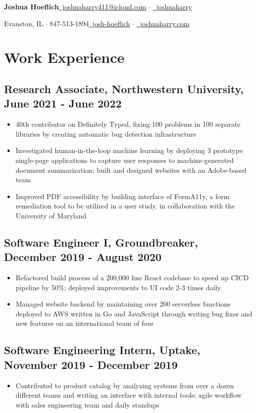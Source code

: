 \documentclass[letterpaper]{article}
\newcommand{\bigdot}{{\large $\cdot$ }}
\begin{document}
{\Large \textbf{Joshua Hoeflich}}\hfill \href{mailto:joshuahoeflich2021@u.northwestern.edu}{{\small \faEnvelope}~joshuaharry411@icloud.com} \bigdot
\href{https://github.com/joshuaharry}{{\small \faGithub}~joshuaharry}

{\normalsize Evanston, IL $\cdot$ 847-513-1894}\hfill \href{https://www.linkedin.com/in/josh-hoeflich/}{{\small \faLinkedinSquare}~josh-hoeflich} $\cdot$ \href{https://joshuaharry.com}{{\small \faGlobe}~joshuaharry.com}
\section*{Work Experience}
\subsection*{Research Associate, Northwestern University, June 2021 - June 2022}
\begin{itemize}
\item 40th contributor on Definitely Typed, fixing 100 problems in 100 separate libraries by creating automatic bug detection infrastructure
\item Investigated human-in-the-loop machine learning by deploying 3 prototype single-page applications to capture user responses to machine-generated document summarization; built and designed websites with an Adobe-based team
\item Improved PDF accessibility by building interface of FormA11y, a form remediation tool to be utilized in a user study, in collaboration with the University of Maryland
\end{itemize}
\subsection*{Software Engineer I, Groundbreaker, December 2019 - August 2020}
\begin{itemize}
\item Refactored build process of a 200,000 line React codebase to speed up CICD pipeline by 50\%; deployed improvements to UI code 2-3 times daily
\item Managed website backend by maintaining over 200 serverless functions deployed to AWS written in Go and JavaScript through writing bug fixes and new features on an international team of four
\end{itemize}
\subsection*{Software Engineering Intern, Uptake, November 2019 - December 2019}
\begin{itemize}
  \item Contributed to product catalog by analyzing systems from over a dozen different teams and writing an interface with internal tools; agile workflow with sales engineering team and daily standups
\end{itemize}
\end{document}
